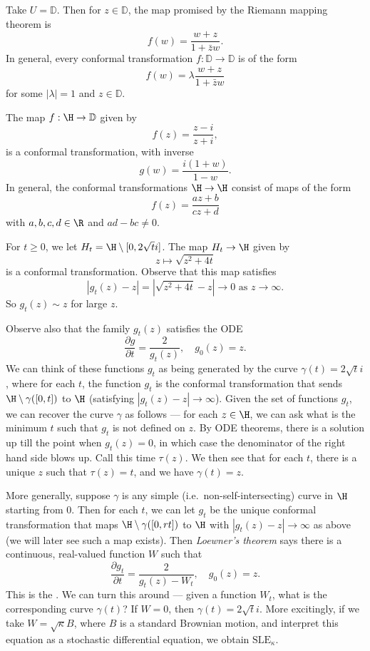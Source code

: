 \documentclass[a4paper]{article}
\renewcommand\D{\mathbb{D}}
\newcommand\SLE{\mathrm{SLE}}
\begin{document}
\begin{eg}
  Take $U = \D$. Then for $z \in \D$, the map promised by the Riemann mapping theorem is
  \[
    f(w) = \frac{w + z}{1 + \bar{z} w}.
  \]
  In general, every conformal transformation $f: \D \to \D$ is of the form
  \[
    f(w) = \lambda \frac{w + z}{1 + \bar{z}w}
  \]
  for some $|\lambda| = 1$ and $z \in \D$.
\end{eg}

\begin{eg}
  The map $f: \H \to \D$ given by
  \[
    f(z) = \frac{z - i}{z + i},
  \]
  is a conformal transformation, with inverse
  \[
    g(w) = \frac{i(1 + w)}{1 - w}.
  \]
  In general, the conformal transformations $\H \to \H$ consist of maps of the form
  \[
    f(z) = \frac{az + b}{c z + d}
  \]
  with $a, b, c, d \in \R$ and $ad - bc \not= 0$.
\end{eg}

\begin{eg}
  For $t \geq 0$, we let $H_t = \H \setminus [0, 2\sqrt{t} i]$. The map $H_t \to \H$ given by
  \[
    z \mapsto \sqrt{z^2 + 4t}
  \]
  is a conformal transformation. Observe that this map satisfies
  \[
    |g_t(z) - z| = |\sqrt{z^2 + 4t} - z| \to 0\text{ as } z \to \infty.
  \]
  So $g_t(z) \sim z$ for large $z$.

  Observe also that the family $g_t(z)$ satisfies the ODE
  \[
    \frac{\partial g}{\partial t} = \frac{2}{g_t(z)},\quad g_0(z) = z.
  \]
  We can think of these functions $g_t$ as being generated by the curve $\gamma(t) = 2 \sqrt{t}i$, where for each $t$, the function $g_t$ is the conformal transformation that sends $\H \setminus \gamma([0, t])$ to $\H$ (satisfying $|g_t(z) - z| \to \infty$). Given the set of functions $g_t$, we can recover the curve $\gamma$ as follows --- for each $z \in \H$, we can ask what is the minimum $t$ such that $g_t$ is not defined on $z$. By ODE theorems, there is a solution up till the point when $g_t(z) = 0$, in which case the denominator of the right hand side blows up. Call this time $\tau(z)$. We then see that for each $t$, there is a unique $z$ such that $\tau(z) = t$, and we have $\gamma(t) = z$.

  More generally, suppose $\gamma$ is any simple (i.e.\ non-self-intersecting) curve in $\H$ starting from $0$. Then for each $t$, we can let $g_t$ be the unique conformal transformation that maps $\H \setminus \gamma([0, rt])$ to $\H$ with $|g_t(z) - z| \to \infty$ as above (we will later see such a map exists). Then \emph{Loewner's theorem} says there is a continuous, real-valued function $W$ such that
  \[
    \frac{\partial g_t}{\partial t} = \frac{2}{g_t(z) - W_t},\quad g_0(z) = z.
  \]
  This is the . We can turn this around --- given a function $W_t$, what is the corresponding curve $\gamma(t)$? If $W = 0$, then $\gamma(t) = 2\sqrt{t}i$. More excitingly, if we take $W = \sqrt{\kappa} B$, where $B$ is a standard Brownian motion, and interpret this equation as a stochastic differential equation, we obtain $\SLE_\kappa$.
\end{eg}
\end{document}
